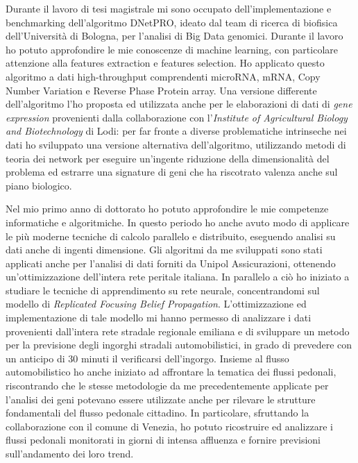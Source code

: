 \documentclass[a4paper,11pt]{article}
\begin{document}
Durante il lavoro di tesi magistrale mi sono occupato dell'implementazione e benchmarking dell'algoritmo DNetPRO, ideato dal team di ricerca di biofisica dell'Università di Bologna, per l'analisi di Big Data genomici.
Durante il lavoro ho potuto approfondire le mie conoscenze di machine learning, con particolare attenzione alla features extraction e features selection.
Ho applicato questo algoritmo a dati high-throughput comprendenti microRNA, mRNA, Copy Number Variation e Reverse Phase Protein array.
Una versione differente dell'algoritmo l'ho proposta ed utilizzata anche per le elaborazioni di dati di \emph{gene expression} provenienti dalla collaborazione con l'\emph{Institute of Agricultural Biology and Biotechnology} di Lodi: per far fronte a diverse problematiche intrinseche nei dati ho sviluppato una versione alternativa dell'algoritmo, utilizzando metodi di teoria dei network per eseguire un'ingente riduzione della dimensionalità del problema ed estrarre una signature di geni che ha riscotrato valenza anche sul piano biologico.

Nel mio primo anno di dottorato ho potuto approfondire le mie competenze informatiche e algoritmiche.
In questo periodo ho anche avuto modo di applicare le più moderne tecniche di calcolo parallelo e distribuito, eseguendo analisi su dati anche di ingenti dimensione.
Gli algoritmi da me sviluppati sono stati applicati anche per l'analisi di dati forniti da Unipol Assicurazioni, ottenendo un'ottimizzazione dell'intera rete peritale italiana.
In parallelo a ciò ho iniziato a studiare le tecniche di apprendimento su rete neurale, concentrandomi sul modello di \emph{Replicated Focusing Belief Propagation}.
L'ottimizzazione ed implementazione di tale modello mi hanno permesso di analizzare i dati provenienti dall'intera rete stradale regionale emiliana e di sviluppare un metodo per la previsione degli ingorghi stradali automobilistici, in grado di prevedere con un anticipo di 30 minuti il verificarsi dell'ingorgo.
Insieme al flusso automobilistico ho anche iniziato ad affrontare la tematica dei flussi pedonali, riscontrando che le stesse metodologie da me precedentemente applicate per l'analisi dei geni potevano essere utilizzate anche per rilevare le strutture fondamentali del flusso pedonale cittadino.
In particolare, sfruttando la collaborazione con il comune di Venezia, ho potuto ricostruire ed analizzare i flussi pedonali monitorati in giorni di intensa affluenza e fornire previsioni sull'andamento dei loro trend.
\end{document}
